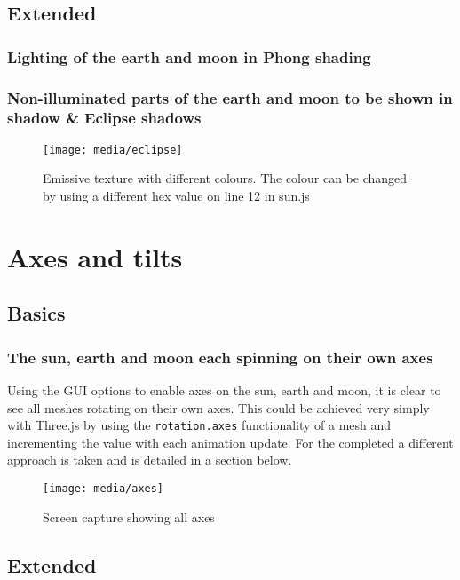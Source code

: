 \documentclass[titlepage]{article}
\begin{document}
\subsection{Extended}

\subsubsection{Lighting of the earth and moon in Phong shading}


\subsubsection{Non-illuminated parts of the earth and moon to be shown in shadow \& Eclipse shadows}


\begin{figure}[h!]
                \centering
                \texttt{[image: media/eclipse]}
                \caption{Emissive texture with different colours. The colour can be changed by using a different hex value on line 12 in sun.js}
\end{figure}
\medskip

\section{Axes and tilts}

\subsection{Basics}
\subsubsection{The sun, earth and moon each spinning on their own axes}
Using the GUI options to enable axes on the sun, earth and moon, it is clear to see all meshes rotating on their own axes. This could be achieved very simply with Three.js by using the \texttt{rotation.axes} functionality of a mesh and incrementing the value with each animation update. For the completed a different approach is taken and is detailed in a section below.
\begin{figure}[h!]
                \centering
                \texttt{[image: media/axes]}
                \caption{Screen capture showing all axes}
\end{figure}

\subsection{Extended}
\end{document}
